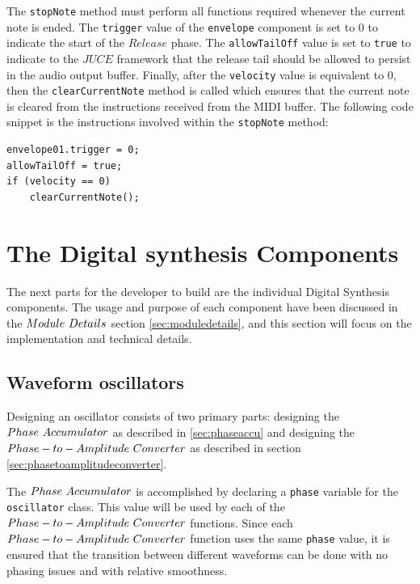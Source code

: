 \documentclass[a4paper,12pt]{report}
\begin{document}
The \texttt{stop\-Note} method must perform all functions required whenever the current note is ended. The \texttt{trigger} value of the \texttt{envelope} component is set to $0$ to indicate the start of the $Release$ phase. The \texttt{allow\-Tail\-Off} value is set to \texttt{true} to indicate to the $JUCE$ framework that the release tail should be allowed to persist in the audio output buffer. Finally, after the \texttt{velocity} value is equivalent to $0$, then the \texttt{clear\-Current\-Note} method is called which ensures that the current note is cleared from the instructions received from the MIDI buffer. The following code snippet is the instructions involved within the \texttt{stop\-Note} method:

 \noindent\begin{minipage}{\linewidth} \begin{lstlisting}[caption={\texttt{stopNote()}},label={code:stopnote},captionpos=b]
envelope01.trigger = 0;
allowTailOff = true;
if (velocity == 0)
    clearCurrentNote();
\end{lstlisting} \end{minipage}


\section{The Digital synthesis Components}
\label{sec:digitalsynthesiscomponents}
The next parts for the developer to build are the individual Digital Synthesis components. The usage and purpose of each component have been discussed in the $Module\ \-Details$ section \ref{sec:moduledetails}, and this section will focus on the implementation and technical details.

\subsection{Waveform oscillators}
\label{subsec:waveformosc}
Designing an oscillator consists of two primary parts: designing the $Phase\ \-Accumulator$ as described in \ref{sec:phaseaccu} and designing the $Phase-to-Amplitude\ \-Converter$ as described in section \ref{sec:phasetoamplitudeconverter}.

The $Phase\ \-Accumulator$ is accomplished by declaring a \texttt{phase} variable for the \texttt{oscillator} class. This value will be used by each of the $Phase-to-Amplitude\ \-Converter$ functions. Since each $Phase-to-Amplitude\ \-Converter$ function uses the same \texttt{phase} value, it is ensured that the transition between different waveforms can be done with no phasing issues and with relative smoothness.
\end{document}
